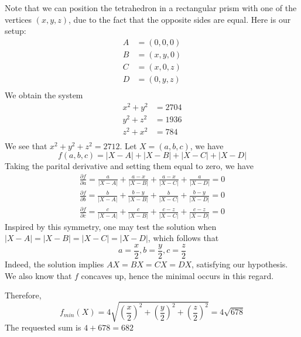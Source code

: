 \begin{enumerate}
Note that we can position the tetrahedron in a rectangular prism with one of the vertices $(x,y,z)$, due to the fact that the opposite sides are equal. Here is our setup:\begin{align*}A&=(0,0,0)\\B&=(x,y,0)\\C&=(x,0,z)\\D&=(0,y,z)\\\end{align*}
We obtain the system\begin{align*}x^2+y^2&=2704\\y^2+z^2&=1936\\z^2+x^2&=784\\\end{align*}
We see that $x^2+y^2+z^2=2712$. Let $X=(a,b,c)$, we have
 \[f(a,b,c)=\lvert  X-A\rvert+\lvert  X-B\rvert+\lvert  X-C\rvert+\lvert  X-D\rvert\]Taking the parital derivative and setting them equal to zero, we have\begin{align*}\frac{\partial f}{\partial a}=\frac{a}{\lvert  X-A\rvert}+\frac{a-x}{\lvert  X-B\rvert}+\frac{a-x}{\lvert  X-C\rvert}+\frac{a}{\lvert X-D\rvert}=0\\\frac{\partial f}{\partial b}=\frac{b}{\lvert  X-A\rvert}+\frac{b-y}{\lvert  X-B\rvert}+\frac{b}{\lvert  X-C\rvert}+\frac{b-y}{\lvert X-D\rvert}=0\\\frac{\partial f}{\partial c}=\frac{c}{\lvert  X-A\rvert}+\frac{c}{\lvert  X-B\rvert}+\frac{c-z}{\lvert  X-C\rvert}+\frac{c-z}{\lvert X-D\rvert}=0\end{align*}
Inspired by this symmetry, one may test the solution when $\lvert  X-A\rvert=\lvert  X-B\rvert=\lvert  X-C\rvert=\lvert  X-D\rvert$, which follows that
 \[a=\frac{x}{2},b=\frac{y}{2},c=\frac{z}{2}\]Indeed, the solution implies $AX=BX=CX=DX$, satisfying our hypothesis. We also know that $f$ concaves up, hence the minimal occurs in this regard.

 Therefore,
 \[f_{min}(X)=4\sqrt{\left(\frac{x}{2}\right)^2+\left(\frac{y}{2}\right)^2+\left(\frac{z}{2}\right)^2}=4\sqrt{678}\]The requested sum is $4+678=\boxed{682}$



\end{enumerate}